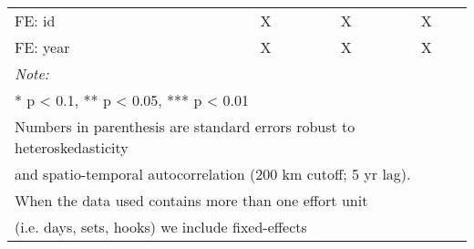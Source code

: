 \begin{table}
\begin{tabular}[t]{lccc}
\midrule
FE: id & X & X & X\\
FE: year & X & X & X\\
\midrule
\bottomrule
\multicolumn{4}{l}{\rule{0pt}{1em}\textit{Note: }}\\
\multicolumn{4}{l}{\rule{0pt}{1em}* p < 0.1, ** p < 0.05, *** p < 0.01}\\
\multicolumn{4}{l}{\rule{0pt}{1em}Numbers in parenthesis are standard errors robust to heteroskedasticity}\\
\multicolumn{4}{l}{\rule{0pt}{1em}and spatio-temporal autocorrelation (200 km cutoff; 5 yr lag).}\\
\multicolumn{4}{l}{\rule{0pt}{1em}When the data used contains more than one effort unit}\\
\multicolumn{4}{l}{\rule{0pt}{1em}(i.e. days, sets, hooks) we include fixed-effects}\\
\end{tabular}
\end{table}